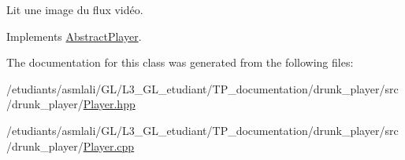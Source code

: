 Lit une image du flux vidéo. 



Implements \hyperlink{classAbstractPlayer_a5c9a863c96224dd297aa44c69010cd94}{Abstract\+Player}.



The documentation for this class was generated from the following files\+:\begin{DoxyCompactItemize}
\item 
/etudiants/asmlali/\+G\+L/\+L3\+\_\+\+G\+L\+\_\+etudiant/\+T\+P\+\_\+documentation/drunk\+\_\+player/src/drunk\+\_\+player/\hyperlink{Player_8hpp}{Player.\+hpp}\item 
/etudiants/asmlali/\+G\+L/\+L3\+\_\+\+G\+L\+\_\+etudiant/\+T\+P\+\_\+documentation/drunk\+\_\+player/src/drunk\+\_\+player/\hyperlink{Player_8cpp}{Player.\+cpp}\end{DoxyCompactItemize}
